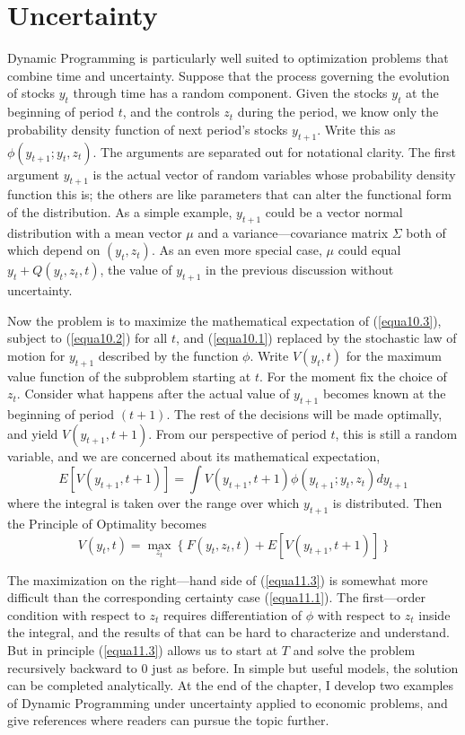 \section*{Uncertainty}

Dynamic Programming is particularly well suited to optimization problems that combine time and uncertainty. Suppose that the process governing the evolution of stocks $y_t$ through time has a random component. Given the stocks $y_t$ at the beginning of period $t$, and the controls $z_t$ during the period, we know only the probability density function of next period's stocks $y_{t+1}$. Write this as $\phi(y_{t+1}; y_t, z_t)$. The arguments are separated out for notational clarity. The first argument $y_{t+1}$ is the actual vector of random variables whose probability density function this is; the others are like parameters that can alter the functional form of the distribution. As a simple example, $y_{t+1}$ could be a vector normal distribution with a mean vector $\mu$ and a variance—covariance matrix $\Sigma$ both of which depend on $(y_t, z_t)$. As an even more special case, $\mu$ could equal $y_t + Q(y_t, z_t, t)$, the value of $y_{t+1}$ in the previous discussion without uncertainty.

Now the problem is to maximize the mathematical expectation of (\ref{equa10.3}), subject to (\ref{equa10.2}) for all $t$, and (\ref{equa10.1}) replaced by the stochastic law of motion for $y_{t+1}$ described by the function $\phi$. Write $V(y_t, t)$ for the maximum value function of the subproblem starting at $t$. For the moment fix the choice of $z_t$. Consider what happens after the actual value of $y_{t+1}$ becomes known at the beginning of period $(t+ 1)$. The rest of the decisions will be made optimally, and yield $V(y_{t+1}, t+1)$. From our perspective of period $t$, this is still a random variable, and we are concerned about its mathematical expectation,
\begin{equation} \label{equa11.2}
E[V(y_{t+1}, t+1 )] = \int V(y_{t+1}, t+1) \phi(y_{t+1}; y_t, z_t) d y_{t+1}
\end{equation}
where the integral is taken over the range over which $y_{t+1}$ is distributed. Then the Principle of Optimality becomes
\begin{equation} \label{equa11.3}
V(y_t, t) = \mathop{\max}\limits_{z_t} \ \{ \ F(y_t, z_t, t) + E[V(y_{t+1}, t+1)]  \ \}
\end{equation}

The maximization on the right—hand side of (\ref{equa11.3}) is somewhat more difficult than the corresponding certainty case (\ref{equa11.1}). The first—order condition with respect to $z_t$ requires differentiation of $\phi$ with respect to $z_t$ inside the integral, and the results of that can be hard to characterize and understand. But in principle (\ref{equa11.3}) allows us to start at $T$ and solve the problem recursively backward to 0 just as before. In simple but useful models, the solution can be completed analytically. At the end of the chapter, I develop two examples of Dynamic Programming under uncertainty applied to economic problems, and give references where readers can pursue the topic further.

